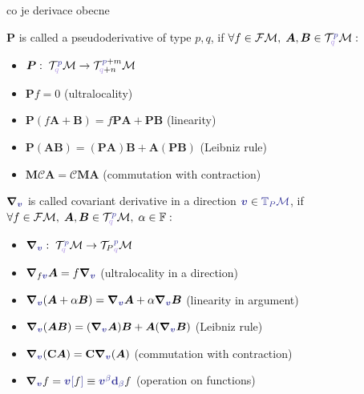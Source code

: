 \begin{definition}[Derivative]
    co je derivace obecne
\end{definition}
\begin{definition}[Pseudoderivative]
\label{def:pseudoderivative}
    $\bm P$ is called a pseudoderivative of type $p,q$, if $\forall f\in\FM, \; \bm A,\bm B\in \TT^{\bluee p}_{\blueee q} \M: $
    \begin{itemize}
        \item $\bm P:\; \TT^{\bluee p}_{\blueee q}\M\rightarrow \TT^{\bluee p+m}_{\blueee q+n}\M$
        \item $\bm P f=0$ (ultralocality)
        \item $\bm P(f\bm A+\bm B)=f\bm P\bm A+\bm P \bm B$ (linearity)
        \item $\bm P(\bm{AB})=(\bm{PA})\bm B+ \bm A(\bm{PB})$ (Leibniz rule)
        \item $\bm M \mathcal C \bm A=\mathcal C\bm{MA}$ (commutation with contraction)
    \end{itemize}
\end{definition}

\begin{definition}
\label{def:covariantDerivative}
    $\bm\nabla_{\bluee{\bm v}}$ is called covariant derivative in a direction $\bluee{\bm v} \in \bluee{\T_P\M}$, if $\forall f\in\FM, \; \bm A,\bm B\in \TT^{\bluee p}_{\blueee q} \M,\; \alpha\in\mathbb F: $
    \begin{itemize}
        \item $\bm\nabla_{\bluee{\bm v}}:\; \TT^{\bluee p}_{\blueee q} \M \rightarrow {\TT_P}^{\bluee p}_{\blueee q} \M$
        \item $\bm\nabla_{f\bluee{\bm v}}\bm A=f\bm\nabla_{\bluee{\bm v}} $ (ultralocality in a direction)
        \item $\bm\nabla_{\bluee{\bm v}}(\bm A+\alpha \bm B)=\bm\nabla_{\bluee{\bm v}}\bm A+\alpha\bm\nabla_{\bluee{\bm v}}\bm B$ (linearity in argument)
        \item $\bm\nabla_{\bluee{\bm v}}(\bm{AB})=(\bm\nabla_{\bluee{\bm v}}\bm A)\bm B+\bm A(\bm\nabla_{\bluee{\bm v}}\bm B)$ (Leibniz rule)
        \item $\bm\nabla_{\bluee{\bm v}}(\mathbf C \bm A)=\mathbf C \bm\nabla_{\bluee{\bm v}}(\bm A)$ (commutation with contraction)
        \item $\bm\nabla_{\bluee{\bm v}}f=\bluee{\bm v[}f\bluee ]\equiv\bluee{\bm v^\beta \bm \d_\beta} f$ (operation on functions)
    \end{itemize}
\end{definition}

